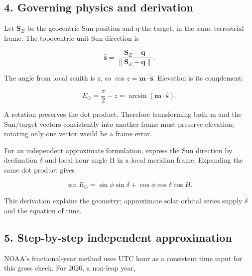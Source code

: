 \documentclass[10pt,a4paper]{article}
\numberwithin{equation}{section}
\begin{document}
\subsection*{4. Governing physics and derivation}
\begin{sloppypar}Let \(\mathbf S_E\) be the geocentric Sun position and q the target, in the same terrestrial frame. The topocentric unit Sun direction is\end{sloppypar}


\begin{equation}\hat{\mathbf s}=\frac{\mathbf S_E-\mathbf q}{\|\mathbf S_E-\mathbf q\|}.\label{eq:ch8-1}\end{equation}

\begin{sloppypar}The angle from local zenith is z, so \(\cos z=\mathbf m\cdot\hat{\mathbf s}\). Elevation is its complement:\end{sloppypar}


\begin{equation}E_\odot=\frac\pi2-z=
\arcsin(\mathbf m\cdot\hat{\mathbf s}).\label{eq:solar-elevation}\end{equation}

\begin{sloppypar}A rotation preserves the dot product. Therefore transforming both m and the Sun/target vectors consistently into another frame must preserve elevation; rotating only one vector would be a frame error.\end{sloppypar}


\begin{sloppypar}For an independent approximate formulation, express the Sun direction by declination \(\delta\) and local hour angle H in a local meridian frame. Expanding the same dot product gives\end{sloppypar}


\begin{equation}\sin E_\odot=
\sin\phi\sin\delta+\cos\phi\cos\delta\cos H.\label{eq:ch8-3}\end{equation}

\begin{sloppypar}This derivation explains the geometry; approximate solar orbital series supply \(\delta\) and the equation of time.\end{sloppypar}


\subsection*{5. Step-by-step independent approximation}
\begin{sloppypar}NOAA's fractional-year method uses UTC hour as a consistent time input for this gross check. For 2026, a non-leap year,\end{sloppypar}
\end{document}
